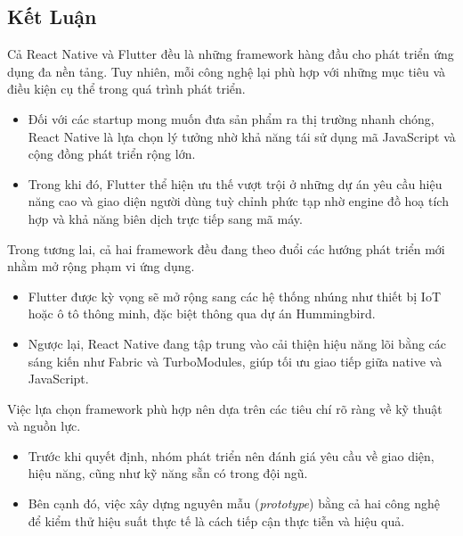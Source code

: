 \subsection{Kết Luận}
\renewcommand{\labelitemi}{--}    
\begin{flushleft}
  \hspace*{0.8cm}Cả React Native và Flutter đều là những framework hàng đầu cho phát triển ứng dụng đa nền tảng. Tuy nhiên, mỗi công nghệ lại phù hợp với những mục tiêu và điều kiện cụ thể trong quá trình phát triển.
  
  \setlength{\leftmargini}{1.5cm}
  \begin{itemize}
    \item Đối với các startup mong muốn đưa sản phẩm ra thị trường nhanh chóng, React Native là lựa chọn lý tưởng nhờ khả năng tái sử dụng mã JavaScript và cộng đồng phát triển rộng lớn.
    \item Trong khi đó, Flutter thể hiện ưu thế vượt trội ở những dự án yêu cầu hiệu năng cao và giao diện người dùng tuỳ chỉnh phức tạp nhờ engine đồ hoạ tích hợp và khả năng biên dịch trực tiếp sang mã máy.
  \end{itemize}
\end{flushleft}

\begin{flushleft}
  \hspace*{0.8cm}Trong tương lai, cả hai framework đều đang theo đuổi các hướng phát triển mới nhằm mở rộng phạm vi ứng dụng.

  \setlength{\leftmargini}{1.5cm}
  \begin{itemize}
    \item Flutter được kỳ vọng sẽ mở rộng sang các hệ thống nhúng như thiết bị IoT hoặc ô tô thông minh, đặc biệt thông qua dự án Hummingbird.
    \item Ngược lại, React Native đang tập trung vào cải thiện hiệu năng lõi bằng các sáng kiến như Fabric và TurboModules, giúp tối ưu giao tiếp giữa native và JavaScript.
  \end{itemize}
\end{flushleft}

\begin{flushleft}
  \hspace*{0.8cm}Việc lựa chọn framework phù hợp nên dựa trên các tiêu chí rõ ràng về kỹ thuật và nguồn lực.

  \setlength{\leftmargini}{1.5cm}
  \begin{itemize}
    \item Trước khi quyết định, nhóm phát triển nên đánh giá yêu cầu về giao diện, hiệu năng, cũng như kỹ năng sẵn có trong đội ngũ.
    \item Bên cạnh đó, việc xây dựng nguyên mẫu (\textit{prototype}) bằng cả hai công nghệ để kiểm thử hiệu suất thực tế là cách tiếp cận thực tiễn và hiệu quả.
  \end{itemize}
\end{flushleft}
